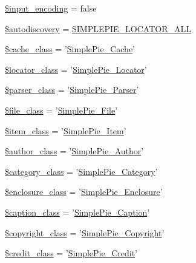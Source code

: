 \begin{DoxyCompactItemize}
\item 
\hyperlink{class_simple_pie_a53e5be5e25d0ea70f4beb68dba6faa45}{\$input\-\_\-encoding} = false
\item 
\hyperlink{class_simple_pie_aad5f9f0285ed8c9e5559ece55d956878}{\$autodiscovery} = \hyperlink{simplepie_8inc_a77835b708f60cde39bf93958e683a5f1}{S\-I\-M\-P\-L\-E\-P\-I\-E\-\_\-\-L\-O\-C\-A\-T\-O\-R\-\_\-\-A\-L\-L}
\item 
\hyperlink{class_simple_pie_a5dcabf38eebe3926561a1324cada8f46}{\$cache\-\_\-class} = '\hyperlink{class_simple_pie___cache}{Simple\-Pie\-\_\-\-Cache}'
\item 
\hyperlink{class_simple_pie_a78b445e585d9020b793d8b347cde4f2b}{\$locator\-\_\-class} = '\hyperlink{class_simple_pie___locator}{Simple\-Pie\-\_\-\-Locator}'
\item 
\hyperlink{class_simple_pie_a1a11ed689e8dfd326660a6d2bf59465c}{\$parser\-\_\-class} = '\hyperlink{class_simple_pie___parser}{Simple\-Pie\-\_\-\-Parser}'
\item 
\hyperlink{class_simple_pie_ab099e826b397c449e55d6b38afc3cbaf}{\$file\-\_\-class} = '\hyperlink{class_simple_pie___file}{Simple\-Pie\-\_\-\-File}'
\item 
\hyperlink{class_simple_pie_a9227c405059b7656a4fe83106d20e91d}{\$item\-\_\-class} = '\hyperlink{class_simple_pie___item}{Simple\-Pie\-\_\-\-Item}'
\item 
\hyperlink{class_simple_pie_aa4bb6b200f0727ec0723c20aee18eb2b}{\$author\-\_\-class} = '\hyperlink{class_simple_pie___author}{Simple\-Pie\-\_\-\-Author}'
\item 
\hyperlink{class_simple_pie_a511f03f4cff321a532f12cda469282ec}{\$category\-\_\-class} = '\hyperlink{class_simple_pie___category}{Simple\-Pie\-\_\-\-Category}'
\item 
\hyperlink{class_simple_pie_af715ec79332822090e78b66ca7974013}{\$enclosure\-\_\-class} = '\hyperlink{class_simple_pie___enclosure}{Simple\-Pie\-\_\-\-Enclosure}'
\item 
\hyperlink{class_simple_pie_a9293b34e9b054d7d1bfa7f0ab1e17e55}{\$caption\-\_\-class} = '\hyperlink{class_simple_pie___caption}{Simple\-Pie\-\_\-\-Caption}'
\item 
\hyperlink{class_simple_pie_a070ce10f15501097766d543a7090b03c}{\$copyright\-\_\-class} = '\hyperlink{class_simple_pie___copyright}{Simple\-Pie\-\_\-\-Copyright}'
\item 
\hyperlink{class_simple_pie_a47004e6ac04e56486b40d45072f423f7}{\$credit\-\_\-class} = '\hyperlink{class_simple_pie___credit}{Simple\-Pie\-\_\-\-Credit}'

\end{DoxyCompactItemize}
